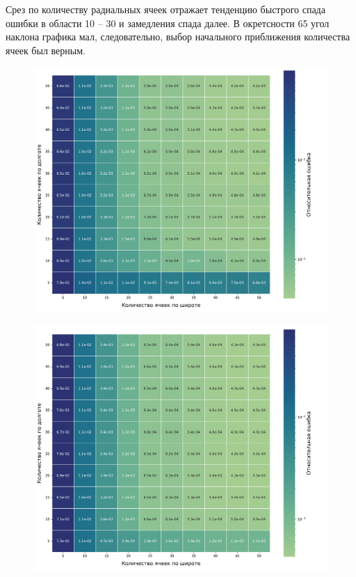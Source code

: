  Срез по количеству радиальных ячеек отражает тенденцию быстрого спада ошибки в области
 10 -- 30 и замедления спада далее. В окретсности 65 угол наклона графика мал, следовательно,
 выбор начального приближения количества ячеек был верным.

 \begin{figure}[h!]
    \centering
    \includegraphics[width=0.85\linewidth]{../images/solution/atmo/2357_heatmap.png}
    \label{fig:atmo:2357_heatmap}
 \end{figure}

 \begin{figure}[h!]
    \centering
    \includegraphics[width=0.85\linewidth]{../images/solution/atmo/2375_heatmap.png}
    \label{fig:atmo:2375_heatmap}
 \end{figure}


